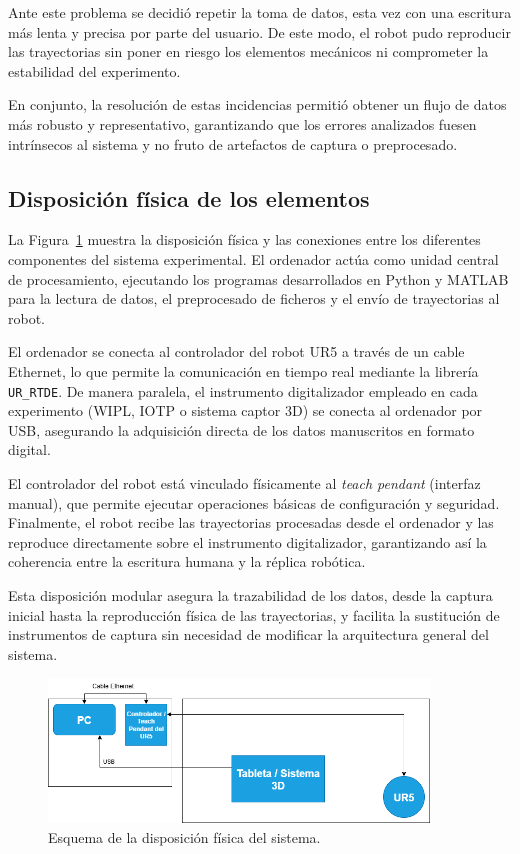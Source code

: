 \documentclass[12pt,a4paper,oneside]{report}
\begin{document}
Ante este problema se decidió repetir la toma de datos, esta vez 
con una escritura más lenta y precisa por parte del usuario. De 
este modo, el robot pudo reproducir las trayectorias sin poner en 
riesgo los elementos mecánicos ni comprometer la estabilidad del 
experimento.

En conjunto, la resolución de estas incidencias permitió obtener 
un flujo de datos más robusto y representativo, garantizando que 
los errores analizados fuesen intrínsecos al sistema y no fruto de 
artefactos de captura o preprocesado.

\subsection{Disposición física de los elementos}

La Figura~\ref{fig:disposicionfisica} muestra la disposición 
física y las conexiones entre los diferentes componentes del 
sistema experimental. El ordenador actúa como unidad central de 
procesamiento, ejecutando los programas desarrollados en Python y 
MATLAB para la lectura de datos, el preprocesado de ficheros y el 
envío de trayectorias al robot. 

El ordenador se conecta al controlador del robot \acrshort{UR5} a 
través de un cable Ethernet, lo que permite la comunicación en 
tiempo real mediante la librería \texttt{UR\_RTDE}. De manera 
paralela, el instrumento digitalizador empleado en cada experimento 
(\acrshort{WIPL}, \acrshort{IOTP} o sistema captor 3D) se conecta 
al ordenador por USB, asegurando la adquisición directa de los 
datos manuscritos en formato digital. 

El controlador del robot está vinculado físicamente al 
\textit{teach pendant} (interfaz manual), que permite ejecutar 
operaciones básicas de configuración y seguridad. Finalmente, el 
robot recibe las trayectorias procesadas desde el ordenador y las 
reproduce directamente sobre el instrumento digitalizador, 
garantizando así la coherencia entre la escritura humana y la 
réplica robótica. 

Esta disposición modular asegura la trazabilidad de los datos, 
desde la captura inicial hasta la reproducción física de las 
trayectorias, y facilita la sustitución de instrumentos de 
captura sin necesidad de modificar la arquitectura general del 
sistema.

\begin{figure}[H]
\centering
\includegraphics[width=0.9\textwidth]{figuras/disposicionfisica.png}
\caption{Esquema de la disposición física del sistema.}
\label{fig:disposicionfisica}
\end{figure}
\end{document}
